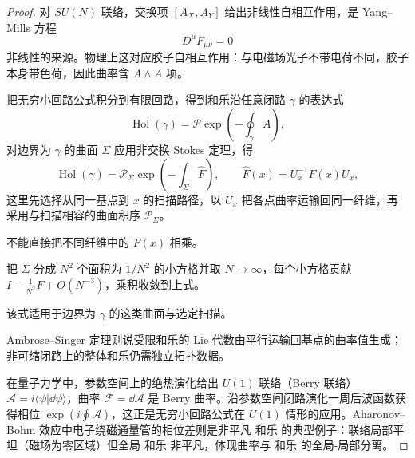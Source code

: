 \begin{proof}
对 $SU(N)$ 联络，交换项 $[A_X,A_Y]$ 给出非线性自相互作用，是 Yang--Mills 方程
\begin{equation*}
D^\mu F_{\mu\nu}=0
\end{equation*}
非线性的来源。物理上这对应胶子自相互作用：与电磁场光子不带电荷不同，胶子本身带色荷，因此曲率含 $A\wedge A$ 项。

把无穷小回路公式积分到有限回路，得到和乐沿任意闭路 $\gamma$ 的表达式
\begin{equation*}
\operatorname{Hol}(\gamma)=\mathcal P\exp\left(-\oint_\gamma A\right),
\end{equation*}
对边界为 $\gamma$ 的曲面 $\Sigma$ 应用非交换 Stokes 定理，得
\begin{equation*}
\operatorname{Hol}(\gamma)=\mathcal P_\Sigma\exp\left(-\int_\Sigma \widehat F\right),\qquad \widehat F(x)=U_x^{-1}F(x)U_x,
\end{equation*}
这里先选择从同一基点到 $x$ 的扫描路径，以 $U_x$ 把各点曲率运输回同一纤维，再采用与扫描相容的曲面积序 $\mathcal P_\Sigma$。

不能直接把不同纤维中的 $F(x)$ 相乘。

把 $\Sigma$ 分成 $N^2$ 个面积为 $1/N^2$ 的小方格并取 $N\to\infty$，每个小方格贡献 $I-\frac1{N^2}F+O(N^{-3})$，乘积收敛到上式。

该式适用于边界为 $\gamma$ 的这类曲面与选定扫描。

Ambrose--Singer 定理则说受限和乐的 Lie 代数由平行运输回基点的曲率值生成；非可缩闭路上的整体和乐仍需独立拓扑数据。

在量子力学中，参数空间上的绝热演化给出 $U(1)$ 联络（Berry 联络）$\mathcal A=i\langle\psi|\dd\psi\rangle$，曲率 $\mathcal F=\dd\mathcal A$ 是 Berry 曲率。沿参数空间闭路演化一周后波函数获得相位 $\exp(i\oint\mathcal A)$，这正是无穷小回路公式在 $U(1)$ 情形的应用。Aharonov--Bohm 效应中电子绕磁通量管的相位差则是非平凡 和乐 的典型例子：联络局部平坦（磁场为零区域）但全局 和乐 非平凡，体现曲率与 和乐 的全局-局部分离。
\end{proof}
